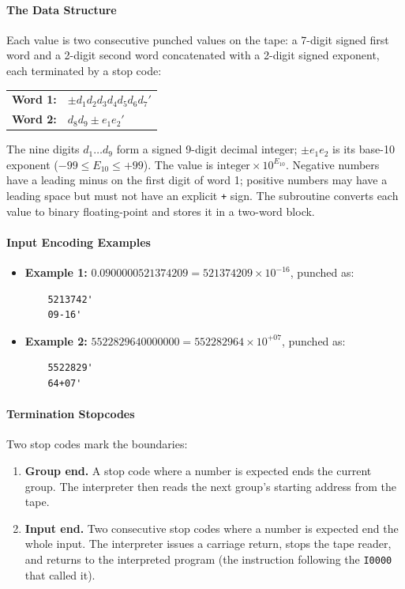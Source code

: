 \paragraph{The Data Structure}
Each value is two consecutive punched values on the tape: a 7-digit signed first word and a 2-digit second word concatenated with a 2-digit signed exponent, each terminated by a stop code:
\begin{center}
\ttfamily
\begin{tabular}{ll}
\textnormal{\textbf{Word 1:}} & $\pm d_1d_2d_3d_4d_5d_6d_7'$ \\
\textnormal{\textbf{Word 2:}} & $d_8d_9\pm e_1e_2'$ \\
\end{tabular}
\end{center}
The nine digits $d_1 \ldots d_9$ form a signed 9-digit decimal integer; $\pm e_1 e_2$ is its base-10 exponent ($-99 \le E_{10} \le +99$). The value is $\text{integer} \times 10^{E_{10}}$. Negative numbers have a leading minus on the first digit of word 1; positive numbers may have a leading space but must not have an explicit \texttt{+} sign. The subroutine converts each value to binary floating-point and stores it in a two-word block.

\paragraph{Input Encoding Examples}
\begin{itemize}
    \item \textbf{Example 1:} $0.0900000521374209 = 521374209 \times 10^{-16}$, punched as:
    \begin{verbatim}
    5213742'
    09-16'
    \end{verbatim}
    \item \textbf{Example 2:} $5522829640000000 = 552282964 \times 10^{+07}$, punched as:
    \begin{verbatim}
    5522829'
    64+07'
    \end{verbatim}
\end{itemize}

\paragraph{Termination Stopcodes}
Two stop codes mark the boundaries:
\begin{enumerate}
    \item \textbf{Group end.} A stop code where a number is expected ends the current group. The interpreter then reads the next group's starting address from the tape.
    \item \textbf{Input end.} Two consecutive stop codes where a number is expected end the whole input. The interpreter issues a carriage return, stops the tape reader, and returns to the interpreted program (the instruction following the \texttt{I0000} that called it).
\end{enumerate}

